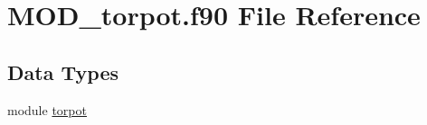 \hypertarget{MOD__torpot_8f90}{\section{M\-O\-D\-\_\-torpot.\-f90 File Reference}
\label{MOD__torpot_8f90}
}
\subsection*{Data Types}
\begin{DoxyCompactItemize}
\item 
module \hyperlink{classtorpot}{torpot}
\end{DoxyCompactItemize}

